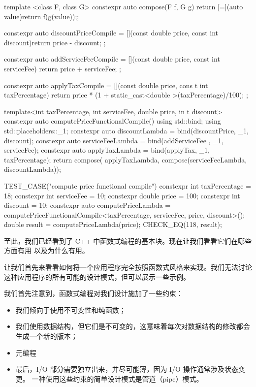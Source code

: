 \begin{cpp}
template <class F, class G>
constexpr auto compose(F f, G g){
  return [=](auto value){return f(g(value));};
}

constexpr auto discountPriceCompile = 
[](const double price, const
int discount){return price - discount;
};

constexpr auto addServiceFeeCompile = 
[](const double price, const
int serviceFee){ 
  return price + serviceFee; 
};

constexpr auto applyTaxCompile = 
[](const double price,
cons t int taxPercentage){ 
  return price * (1 + static_cast<double >(taxPercentage)/100); 
};

template<int taxPercentage, int serviceFee, double price, in t
discount>
constexpr auto computePriceFunctionalCompile() {
  using std::bind;
  using std::placeholders::_1;
  constexpr auto discountLambda = bind(discountPrice, _1, discount);
  constexpr auto serviceFeeLambda = bind(addServiceFee , _1, serviceFee);
  constexpr auto applyTaxLambda = bind(applyTax, _1, taxPercentage);
  return compose( applyTaxLambda, compose(serviceFeeLambda, discountLambda));
}

TEST_CASE("compute price functional compile"){
  constexpr int taxPercentage = 18;
  constexpr int serviceFee = 10;
  constexpr double price = 100;
  constexpr int discount = 10;
  constexpr auto computePriceLambda =
  computePriceFunctionalCompile<taxPercentage, serviceFee, price,
  discount>();
  double result = computePriceLambda(price);
  CHECK_EQ(118, result);
}
\end{cpp}

至此，我们已经看到了 C++ 中函数式编程的基本块。现在让我们看看它们在哪些方面有用
以及为什么有用。


让我们首先来看看如何将一个应用程序完全按照函数式风格来实现。我们无法讨论这种应用程序的所有可能的设计模式，但可以展示一些示例。

我们首先注意到，函数式编程对我们设计施加了一些约束：

\begin{itemize}
\item 
我们倾向于使用不可变性和纯函数；

\item 
我们使用数据结构，但它们是不可变的，这意味着每次对数据结构的修改都会生成一个新的版本；

\item 
元编程

\item 
最后，I/O 部分需要独立出来，并尽可能薄，因为 I/O 操作通常涉及状态变更。
一种使用这些约束的简单设计模式是管道（pipe）模式。
\end{itemize}

